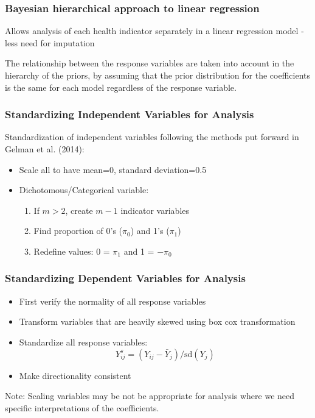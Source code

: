 \documentclass{beamer}
\begin{document}
\begin{frame}
\frametitle{Bayesian hierarchical approach to linear regression}
\itemize
\item Allows analysis of each health indicator separately in a linear regression model - less need for imputation
\item The relationship between the response variables are taken into account in the hierarchy of the priors, by assuming that the prior distribution for the coefficients is the same for each model regardless of the response variable.
\end{frame}

\begin{frame}
\frametitle{Standardizing Independent Variables for Analysis}
Standardization of independent variables following the methods put forward in Gelman et al. (2014):
\begin{itemize}
\item Scale all to have mean=0, standard deviation=0.5
\item Dichotomous/Categorical variable: 
\smallskip
\begin{enumerate}
\item If $m>2$, create $m-1$ indicator variables
\item Find proportion of 0's ($\pi_0$) and 1's ($\pi_1$)
\item Redefine values: 0 = $\pi_1$ and 1 = $-\pi_0$
\end{enumerate}
\end{itemize}
\end{frame}

\begin{frame}
\frametitle{Standardizing Dependent Variables for Analysis}
\begin{itemize}
\item First verify the normality of all response variables
\item Transform variables that are heavily skewed using box cox transformation
\item Standardize all response variables:
\begin{equation}
Y^s_{ij} = (Y_{ij} - \bar{Y}_j)/\text{sd}(Y_j)
\end{equation}
\item Make directionality consistent
\end{itemize}
Note: Scaling variables may be not be appropriate for analysis where we need specific interpretations of the coefficients.
\end{frame}
\end{document}
